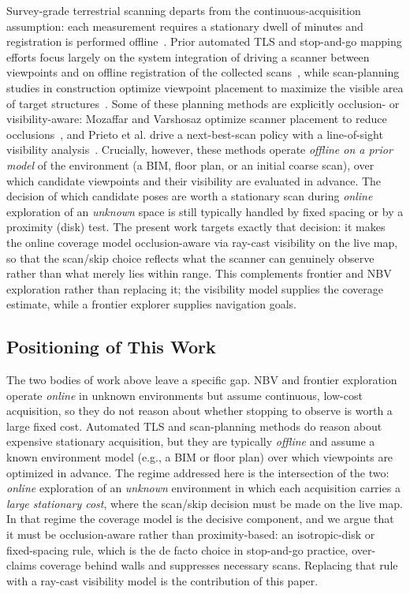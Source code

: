\documentclass[sensors,article,submit,pdftex,moreauthors]{Definitions/mdpi}
\begin{document}
Survey-grade terrestrial scanning departs from the continuous-acquisition
assumption: each measurement requires a stationary dwell of minutes and
registration is performed offline~\cite{stopandgo-review}. Prior automated TLS
and stop-and-go mapping efforts focus largely on the system integration of
driving a scanner between viewpoints and on offline registration of the
collected scans~\cite{stopandgo-registration}, while scan-planning studies in
construction optimize viewpoint placement to maximize the visible area of target
structures~\cite{tls-scanplanning}. Some of these planning methods are
explicitly occlusion- or visibility-aware: Mozaffar and Varshosaz optimize
scanner placement to reduce occlusions~\cite{mozaffar2016occlusion}, and Prieto
et al. drive a next-best-scan policy with a line-of-sight visibility
analysis~\cite{prieto2017nbs}. Crucially, however, these methods operate
\emph{offline on a prior model} of the environment (a BIM, floor plan, or an
initial coarse scan), over which candidate viewpoints and their visibility are
evaluated in advance. The decision of which candidate poses are worth a
stationary scan during \emph{online} exploration of an \emph{unknown} space is
still typically handled by fixed spacing or by a proximity (disk) test. The
present work targets exactly that decision: it makes the online coverage model
occlusion-aware via ray-cast visibility on the live map, so that the scan/skip
choice reflects what the scanner can genuinely observe rather than what merely
lies within range. This complements frontier and NBV exploration rather than
replacing it; the visibility model supplies the coverage estimate, while a
frontier explorer supplies navigation goals.

\subsection{Positioning of This Work}

The two bodies of work above leave a specific gap. NBV and frontier exploration
operate \emph{online} in unknown environments but assume continuous,
low-cost acquisition, so they do not reason about whether stopping to observe is
worth a large fixed cost. Automated TLS and scan-planning methods do reason about
expensive stationary acquisition, but they are typically \emph{offline} and
assume a known environment model (e.g., a BIM or floor plan) over which viewpoints
are optimized in advance. The regime addressed here is the intersection of the
two: \emph{online} exploration of an \emph{unknown} environment in which each
acquisition carries a \emph{large stationary cost}, where the scan/skip decision
must be made on the live map. In that regime the coverage model is the decisive
component, and we argue that it must be occlusion-aware rather than
proximity-based: an isotropic-disk or fixed-spacing rule, which is the de facto
choice in stop-and-go practice, over-claims coverage behind walls and suppresses
necessary scans. Replacing that rule with a ray-cast visibility model is the
contribution of this paper.
\end{document}
